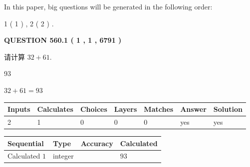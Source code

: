 \documentclass{ctexart}
\begin{document}
   
   
\vspace{0.2in}
   
In this paper, big questions will be generated in the following order: 
   
   
   1 ( 1 )
 ,
   2 ( 2 )
 .
  
\vspace{0.2in}
  
{\textbf{\Large{QUESTION
560.1 
 ( 1 , 1 , 6791 )
}}}
  
  
 
请计算 $ %
32 +  %
61 $.
 
 
 
\noindent{}
 
 

93
 
 
\noindent{}
 
 

 
 
 
\noindent{}
 
 

$ %
32 +  %
61=   %
93$
 
 
\noindent{}
 
 

 
   
   
   
   
\noindent\begin{tabular}{|l|l|l|l|l|l|l|}
 \hline
Inputs & Calculates & Choices & Layers & Matches & Answer & Solution \\ \hline
 2  & 
 1  & 
 0
  & 
 0  & 
 0  & 
  yes & 
  yes 
  \\ \hline
 \end{tabular}
   
   
   
   
\noindent{}
   
   
  
  
\noindent\begin{tabular}{|l|l|l|l|}
\hline
 Sequential & Type & Accuracy & Calculated \\ 
\hline
 
 
  Calculated $  1 $ & integer &  & 
  $ 93 $ 
 \\  \hline  
 \end{tabular}
   
\end{document}
